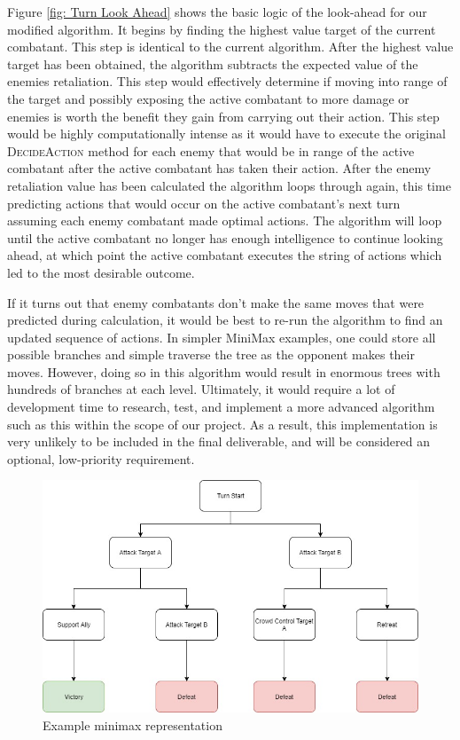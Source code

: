 \documentclass[12pt,a4paper]{report}
\begin{document}
		Figure \ref{fig: Turn Look Ahead} shows the basic logic of the look-ahead for our modified algorithm. It begins by finding the highest value target of the current combatant. This step is identical to the current algorithm. After the highest value target has been obtained, the algorithm subtracts the expected value of the enemies retaliation. This step would effectively determine if moving into range of the target and possibly exposing the active combatant to more damage or enemies is worth the benefit they gain from carrying out their action. This step would be highly computationally intense as it would have to execute the original \textsc{DecideAction} method for each enemy that would be in range of the active combatant after the active combatant has taken their action. After the enemy retaliation value has been calculated the algorithm loops through again, this time predicting actions that would occur on the active combatant's next turn assuming each enemy combatant made optimal actions. The algorithm will loop until the active combatant no longer has enough intelligence to continue looking ahead, at which point the active combatant executes the string of actions which led to the most desirable outcome. 
		
		If it turns out that enemy combatants don't make the same moves that were predicted during calculation, it would be best to re-run the algorithm to find an updated sequence of actions. In simpler MiniMax examples, one could store all possible branches and simple traverse the tree as the opponent makes their moves. However, doing so in this algorithm would result in enormous trees with hundreds of branches at each level. Ultimately, it would require a lot of development time to research, test, and implement a more advanced algorithm such as this within the scope of our project. As a result, this implementation is very unlikely to be included in the final deliverable, and will be considered an optional, low-priority requirement. 
		
		\begin{figure}[H]
			\centering
			\includegraphics[scale=.55]{MiniMax}
			\caption{Example minimax representation}
			\label{fig: Minimax}
		\end{figure}
		
\end{document}
